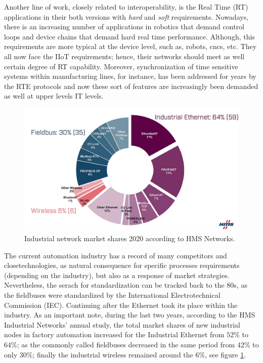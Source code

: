 Another line of work, closely related to interoperability, is the Real Time (RT) applications in their both versions with \emph{hard} and \emph{soft} requirements. 
Nowadays, there is an increasing number of applications in robotics that demand control loops and device chains that
demand hard real time performance. Although, this requirements are more typical at the device level, such as, robots, cncs, etc. They all now face 
the IIoT requirements; hence, their networks should meet as well certain degree of RT capability. Moreover, synchronization of time sensitive
systems within manufacturing lines, for instance, has been addressed for years by the RTE protocols and now these sort of features are increasingly
been demanded as well at upper levels IT levels.



\begin{figure}[ht]
    \centering
    \includegraphics[width=\textwidth]{imgs/intro-buses-share.jpg}
    \caption{Industrial network market shares 2020 according to HMS Networks.\cite{fieldbus_shares}} %
    \label{fig:fieldbus_shares}
\end{figure}

The current automation industry has a record of many competitors and closetechnologies, as natural consequence for specific processes requirements (depending on the industry), 
but also as a response of market strategies. Nevertheless, the serach for standardization
can be tracked back to the $80$s, as the fieldbuses were standardized by the International Electrotechnical Commission (IEC). 
Continuing after the Ethernet took its place within the industry. As an important note, during the last two years, according to the HMS Industrial Networks' annual study,
the total market shares of new industrial nodes in factory automation increased for the Industrial Ethernet from $52\%$ to $64\%$; as the commonly called
fieldbuses decreased in the same period from $42\%$ to only $30\%$; finally the industrial wireless remained around the $6\%$, see figure \ref{fig:fieldbus_shares}. \cite{fieldbus_shares}

